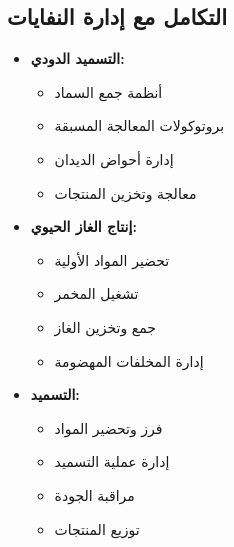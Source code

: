 \subsection{التكامل مع إدارة النفايات}
\begin{itemize}
    \item \textbf{التسميد الدودي:}
    \begin{itemize}
        \item أنظمة جمع السماد
        \item بروتوكولات المعالجة المسبقة
        \item إدارة أحواض الديدان
        \item معالجة وتخزين المنتجات
    \end{itemize}
    
    \item \textbf{إنتاج الغاز الحيوي:}
    \begin{itemize}
        \item تحضير المواد الأولية
        \item تشغيل المخمر
        \item جمع وتخزين الغاز
        \item إدارة المخلفات المهضومة
    \end{itemize}
    
    \item \textbf{التسميد:}
    \begin{itemize}
        \item فرز وتحضير المواد
        \item إدارة عملية التسميد
        \item مراقبة الجودة
        \item توزيع المنتجات
    \end{itemize}
\end{itemize}

